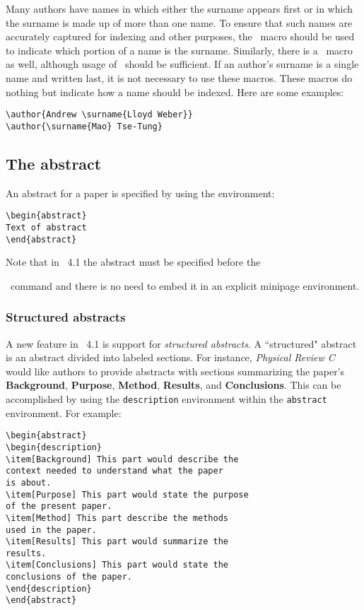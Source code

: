 \documentclass[%
,aps%
 ,twocolumn%
 ,secnumarabic%
,amssymb, amsmath,nobibnotes, aps, prl, floatfix]{revtex4-1}
\begin{document}
Many authors have names in which either the surname appears first
or in which the surname is made up of more than one name. To ensure
that such names are accurately captured for indexing and other
purposes, the \cmd\surname\ macro should be used to indicate which portion
of a name is the surname. Similarly, there is a \cmd\firstname\ macro
as well, although usage of \cmd\surname\ should be sufficient. If an
author's surname is a single name and written last, it is not
necessary to use these macros. These macros do nothing but indicate
how a name should be indexed. Here are some examples:
\begin{verbatim}
\author{Andrew \surname{Lloyd Weber}}
\author{\surname{Mao} Tse-Tung}
\end{verbatim}

\subsection{The abstract}
An abstract for a paper is specified by using the 
environment:
\begin{verbatim}
\begin{abstract}
Text of abstract
\end{abstract}
\end{verbatim}
Note that in \revtex~4.1 the abstract must be specified before the
\cmd\maketitle\ command and there is no need to embed it in an explicit
minipage environment.

\subsubsection{Structured abstracts}
A new feature in \revtex~4.1 is support for \textit{structured abstracts}. A ``structured" abstract is an abstract divided into labeled sections. For instance, \textit{Physical Review C} would like authors to provide abstracts with sections summarizing the paper's  \textbf{Background}, \textbf{Purpose}, \textbf{Method}, \textbf{Results}, and \textbf{Conclusions}. This can be accomplished by using the \texttt{description} environment within the \texttt{abstract} environment.  For example:
\begin{verbatim}
\begin{abstract}
\begin{description}
\item[Background] This part would describe the
context needed to understand what the paper
is about.
\item[Purpose] This part would state the purpose
of the present paper.
\item[Method] This part describe the methods
used in the paper.
\item[Results] This part would summarize the
results.
\item[Conclusions] This part would state the
conclusions of the paper.
\end{description}
\end{abstract}
\end{verbatim}
\end{document}
